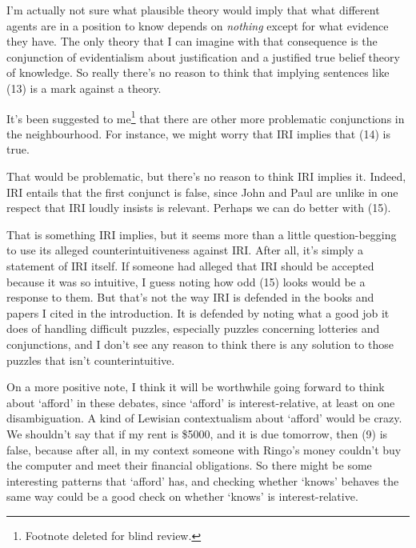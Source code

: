 \noindent I'm actually not sure what plausible theory would imply that what different agents are in a position to know depends on \textit{nothing} except for what evidence they have. The only theory that I can imagine with that consequence is the conjunction of evidentialism about justification and a justified true belief theory of knowledge. So really there's no reason to think that implying sentences like (13) is a mark against a theory.

It's been suggested to me\footnote{Footnote deleted for blind review.} that there are other more problematic conjunctions in the neighbourhood. For instance, we might worry that IRI implies that (14) is true.


\noindent That would be problematic, but there's no reason to think IRI implies it. Indeed, IRI entails that the first conjunct is false, since John and Paul are unlike in one respect that IRI loudly insists is relevant. Perhaps we can do better with (15).


\noindent That is something IRI implies, but it seems more than a little question-begging to use its alleged counterintuitiveness against IRI. After all, it's simply a statement of IRI itself. If someone had alleged that IRI should be accepted because it was so intuitive, I guess noting how odd (15) looks would be a response to them. But that's not the way IRI is defended in the books and papers I cited in the introduction. It is defended by noting what a good job it does of handling difficult puzzles, especially puzzles concerning lotteries and conjunctions, and I don't see any reason to think there is any solution to those puzzles that isn't counterintuitive. 

On a more positive note, I think it will be worthwhile going forward to think about `afford' in these debates, since `afford' is interest-relative, at least on one disambiguation. A kind of Lewisian contextualism about `afford' would be crazy. We shouldn't say that if my rent is \$5000, and it is due tomorrow, then (9) is false, because after all, in my context someone with Ringo's money couldn't buy the computer and meet their financial obligations. So there might be some interesting patterns that `afford' has, and checking whether `knows' behaves the same way could be a good check on whether `knows' is interest-relative.
